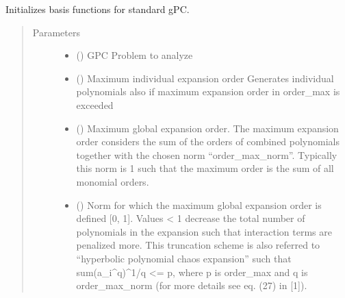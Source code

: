 \documentclass[letterpaper,10pt,english,openany,oneside]{sphinxmanual}
\begin{document}
\begin{fulllineitems}

\begin{fulllineitems}
\label{\detokenize{pygpc:pygpc.Basis.Basis.init_basis_sgpc}}
Initializes basis functions for standard gPC.
\begin{quote}\begin{description}
\item[{Parameters}] \leavevmode\begin{itemize}
\item {} 
 () \textendash{} GPC Problem to analyze

\item {} 
 (\sphinxstyleliteralemphasis{\sphinxupquote{{[}}}\sphinxstyleliteralemphasis{\sphinxupquote{{]} }}) \textendash{} Maximum individual expansion order
Generates individual polynomials also if maximum expansion order in order\_max is exceeded

\item {} 
 () \textendash{} Maximum global expansion order.
The maximum expansion order considers the sum of the orders of combined polynomials together with the
chosen norm “order\_max\_norm”. Typically this norm is 1 such that the maximum order is the sum of all
monomial orders.

\item {} 
 () \textendash{} Norm for which the maximum global expansion order is defined {[}0, 1{]}. Values \textless{} 1 decrease the total number
of polynomials in the expansion such that interaction terms are penalized more. This truncation scheme
is also referred to “hyperbolic polynomial chaos expansion” such that sum(a\_i\textasciicircum{}q)\textasciicircum{}1/q \textless{}= p,
where p is order\_max and q is order\_max\_norm (for more details see eq. (27) in {[}1{]}).


\end{itemize}
\end{description}
\end{quote}
\end{fulllineitems}
\end{fulllineitems}
\end{document}
